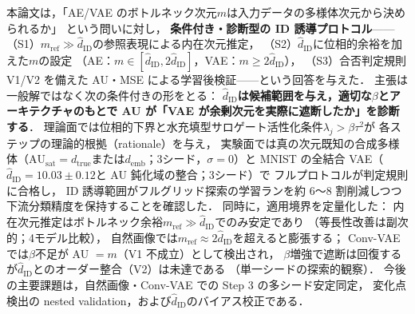 \documentclass[11pt,a4paper]{jsarticle}
\newcommand{\hatdID}{\hat{d}_{\mathrm{ID}}}
\newcommand{\dtrue}{d_{\mathrm{true}}}
\newcommand{\AUsat}{\mathrm{AU}_{\mathrm{sat}}}
\newcommand{\demb}{d_{\mathrm{emb}}}
\begin{document}
本論文は，「AE/VAE のボトルネック次元$m$は入力データの多様体次元から決められるか」
という問いに対し，
\textbf{条件付き・診断型の ID 誘導プロトコル}——
（S1）$m_{\mathrm{ref}} \gg \hatdID$の参照表現による内在次元推定，
（S2）$\hatdID$に位相的余裕を加えた$m$の設定
（AE：$m \in [\hatdID, 2\hatdID]$，VAE：$m \geq 2\hatdID$），
（S3）合否判定規則 V1/V2 を備えた AU・MSE による学習後検証——という回答を与えた．
主張は一般解ではなく次の条件付きの形をとる：
\textbf{$\hatdID$は候補範囲を与え，適切な$\beta$とアーキテクチャのもとで
AU が「VAE が余剰次元を実際に遮断したか」を診断する}．
理論面では位相的下界と水充填型サロゲート活性化条件$\lambda_j > \beta\tau^2$が
各ステップの理論的根拠（rationale）を与え，
実験面では真の次元既知の合成多様体（$\AUsat = \dtrue$または$\demb$；3シード，$\sigma = 0$）と
MNIST の全結合 VAE（$\hatdID = 10.03 \pm 0.12$と AU 鈍化域の整合；3シード）で
フルプロトコルが判定規則に合格し，
ID 誘導範囲がフルグリッド探索の学習ランを約 6〜8 割削減しつつ
下流分類精度を保持することを確認した．
同時に，適用境界を定量化した：
内在次元推定はボトルネック余裕$m_{\mathrm{ref}} \gg \hatdID$でのみ安定であり
（等長性改善は副次的；4モデル比較），
自然画像では$m_{\mathrm{ref}} \approx 2\hatdID$を超えると膨張する；
Conv-VAE では$\beta$不足が AU $= m$（V1 不成立）として検出され，
$\beta$増強で遮断は回復するが$\hatdID$とのオーダー整合（V2）は未達である
（単一シードの探索的観察）．
今後の主要課題は，自然画像・Conv-VAE での Step 3 の多シード安定同定，
変化点検出の nested validation，および$\hatdID$のバイアス校正である．
\end{document}
